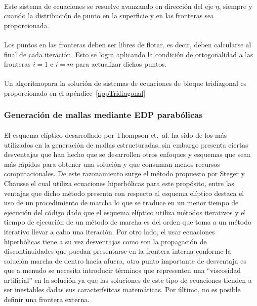 \documentclass[letterpaper, openright, 12pt]{book}
\begin{document}
    \paragraph*{}
        Este sistema de ecuaciones se resuelve avanzando en dirección del eje
        $\eta$, siempre y cuando la distribución de punto en la superficie y en
        las fronteras sea proporcionada.
    \paragraph*{}
        Los puntos en las fronteras deben ser libres de flotar, es decir, deben
        calcularse al final de cada iteración. Esto se logra aplicando la
        condición de ortogonalidad a las fronteras $i = 1$ e $i = m$ para
        actualizar dichos puntos.
    \paragraph*{}
        Un algoritmopara la solución de sistemas de ecuaciones de bloque
        tridiagonal es proporcionado en el apéndice~\ref{appTridiagonal}
    \subsubsection{Generación de mallas mediante EDP parabólicas}
    \paragraph*{}
        El esquema elíptico desarrollado por Thompson et.\ al.
        \cite{thompson1974automatic} ha sido de los más utilizados en la
        generación de mallas estructuradas, sin embargo presenta ciertas
        desventajas que han hecho que se desarrollen otros enfoques y esquemas
        que sean más rápidos para obtener una solución y que consuman menos
        recursos computacionales. De este razonamiento surge el método propuesto
        por Steger y Chausse \cite{Hyperbolic-steger1980generation} el cual
        utiliza ecuaciones hiperbólicas para este propósito, entre las ventajas
        que dicho método presenta con respecto al esquema elíptico destaca el
        uso de un procedimiento de marcha lo que se traduce en un menor tiempo
        de ejecución del código dado que el esquema elíptico utiliza métodos
        iterativos y el tiempo de ejecución de un método de marcha es del orden
        que toma a un método iterativo llevar a cabo una iteración. Por otro
        lado, el usar ecuaciones hiperbólicas tiene a su vez desventajas como
        son la propagación de discontinuidades que puedan presentarse en la
        frontera interna conforme la solución marcha de dentro hacia afuera,
        otro punto importante de desventaja es que a menudo se necesita
        introducir términos que representen una ``viscosidad artificial'' en la
        solución ya que las soluciones de este tipo de ecuaciones tienden a ser
        inestables dadas sus caracterísitcas matemáticas. Por último, no es
        posible definir una frontera externa.
\end{document}
